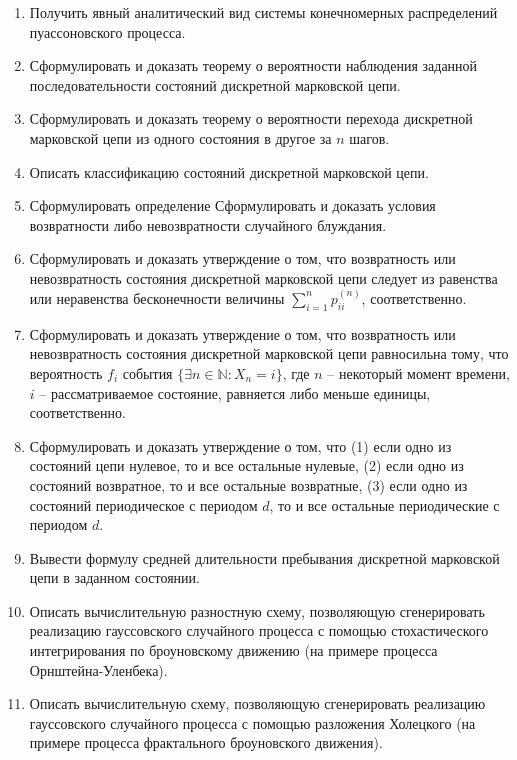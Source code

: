 \documentclass[a4paper,12pt]{extreport}
\renewcommand{\=}[1]{\stackrel{#1}{=}} %
\begin{document}
\begin{enumerate}
	\item Получить явный аналитический вид системы конечномерных
	распределений пуассоновского процесса.

	\item Сформулировать и доказать теорему о вероятности 
	наблюдения заданной последовательности
	состояний дискретной марковской цепи.

	\item Сформулировать и доказать теорему о вероятности перехода 
	дискретной марковской цепи из одного состояния в другое за $n$ шагов.

	\item Описать классификацию состояний дискретной марковской цепи.

	\item Сформулировать определение Сформулировать и доказать условия возвратности либо
	невозвратности случайного блуждания.

	\item Сформулировать и доказать утверждение
	о том, что возвратность или невозвратность состояния дискретной марковской цепи 
	следует из равенства или неравенства бесконечности
	величины $\sum\limits_{i=1}^n p^{(n)}_{ii}$, соответственно.

	\item Сформулировать и доказать утверждение
	о том, что возвратность или невозвратность состояния дискретной марковской цепи 
	равносильна тому, что вероятность $f_i$ события $\{\exists n \in \mathbb{N}: X_n = i\}$,
	где $n$ -- некоторый момент времени, $i$ -- рассматриваемое состояние,
	равняется либо меньше единицы, соответственно.

	\item Сформулировать и доказать утверждение
	о том, что (1) если одно из состояний цепи нулевое, то и все остальные нулевые,
	(2) если одно из состояний возвратное, то и все остальные возвратные,
	(3) если одно из состояний периодическое с периодом $d$, то и все остальные
	периодические с периодом $d$.

	\item Вывести формулу средней длительности пребывания дискретной марковской цепи
	в заданном состоянии.

	\item Описать вычислительную разностную схему, позволяющую
	сгенерировать реализацию гауссовского случайного процесса 
	с помощью стохастического интегрирования по броуновскому движению
	(на примере процесса Орнштейна-Уленбека).

	\item Описать вычислительную схему, позволяющую
	сгенерировать реализацию гауссовского случайного процесса 
	с помощью разложения Холецкого
	(на примере процесса фрактального броуновского движения).


\end{enumerate}
\end{document}
